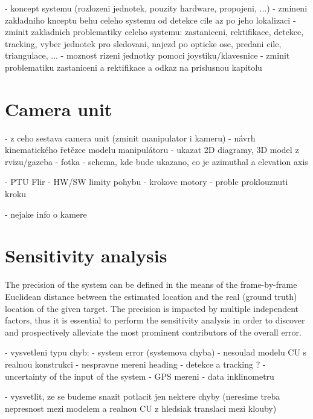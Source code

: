 - koncept systemu (rozlozeni jednotek, pouzity hardware, propojeni, ...)
- zmineni zakladniho knceptu behu celeho systemu od detekce cile az po jeho lokalizaci
- zminit zakladnich problematiky celeho systemu: zastaniceni, rektifikace, detekce, tracking, vyber jednotek pro sledovani, najezd po opticke ose, predani cile, triangulace, ...
- moznost rizeni jednotky pomoci joystiku/klavesnice
- zminit problematiku zastaniceni a rektifikace a odkaz na prislusnou kapitolu

\chapter{Camera unit} \label{txt:camera_unit}

- z ceho sestava camera unit (zminit manipulator i kameru)
- návrh kinematického řetězce modelu manipulátoru
- ukazat 2D diagramy, 3D model z rvizu/gazeba
- fotka
- schema, kde bude ukazano, co je azimuthal a elevation axis

- PTU Flir
	- HW/SW limity pohybu
	- krokove motory
	- proble proklouznuti kroku

- nejake info o kamere


\chapter{Sensitivity analysis} \label{txt:sensitivity_analysis}
The precision of the system can be defined in the means of the frame-by-frame Euclidean distance between the estimated location and the real (ground truth) location of the given target. The precision is impacted by multiple independent factors, thus it is essential to perform the sensitivity analysis in order to discover and prospectively alleviate the most prominent contributors of the overall error. 

- vysvetleni typu chyb:
	- system error (systemova chyba)
		- nesoulad modelu CU s realnou konstrukci
		- nespravne mereni heading
		- detekce a tracking ?
	- uncertainty of the input of the system
		- GPS mereni
		- data inklinometru
	
- vysvetlit, ze se budeme snazit potlacit jen nektere chyby (neresime treba nepresnost mezi modelem a realnou CU z hledsiak translaci mezi klouby)

